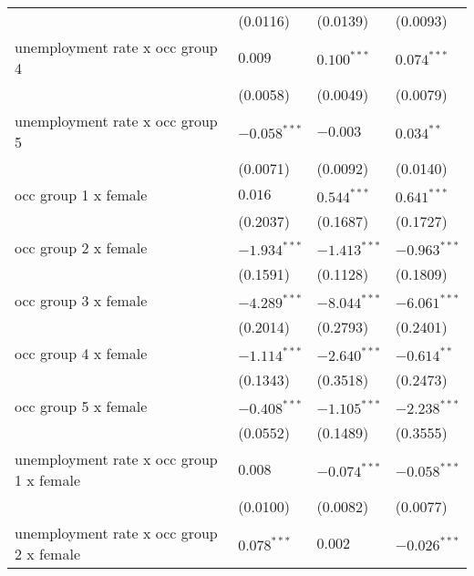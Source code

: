 \begin{tabular}{llll}
                                         &           (0.0116) &           (0.0139) &           (0.0093) \\
unemployment rate x occ group 4          &            $0.009$ &      $0.100^{***}$ &      $0.074^{***}$ \\
                                         &           (0.0058) &           (0.0049) &           (0.0079) \\
unemployment rate x occ group 5          &     $-0.058^{***}$ &           $-0.003$ &       $0.034^{**}$ \\
                                         &           (0.0071) &           (0.0092) &           (0.0140) \\
occ group 1 x female                     &            $0.016$ &      $0.544^{***}$ &      $0.641^{***}$ \\
                                         &           (0.2037) &           (0.1687) &           (0.1727) \\
occ group 2 x female                     &     $-1.934^{***}$ &     $-1.413^{***}$ &     $-0.963^{***}$ \\
                                         &           (0.1591) &           (0.1128) &           (0.1809) \\
occ group 3 x female                     &     $-4.289^{***}$ &     $-8.044^{***}$ &     $-6.061^{***}$ \\
                                         &           (0.2014) &           (0.2793) &           (0.2401) \\
occ group 4 x female                     &     $-1.114^{***}$ &     $-2.640^{***}$ &      $-0.614^{**}$ \\
                                         &           (0.1343) &           (0.3518) &           (0.2473) \\
occ group 5 x female                     &     $-0.408^{***}$ &     $-1.105^{***}$ &     $-2.238^{***}$ \\
                                         &           (0.0552) &           (0.1489) &           (0.3555) \\
unemployment rate x occ group 1 x female &            $0.008$ &     $-0.074^{***}$ &     $-0.058^{***}$ \\
                                         &           (0.0100) &           (0.0082) &           (0.0077) \\
unemployment rate x occ group 2 x female &      $0.078^{***}$ &            $0.002$ &     $-0.026^{***}$ \\

\end{tabular}
